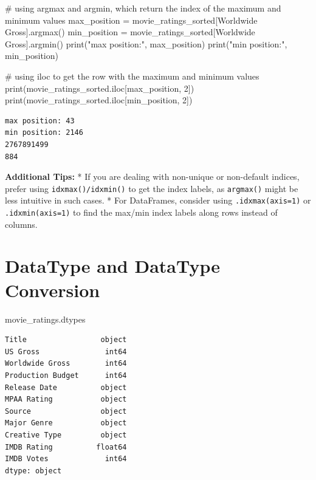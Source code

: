 \documentclass[
  letterpaper,
  DIV=11,
  numbers=noendperiod]{scrreprt}
\newenvironment{Shaded}{\begin{snugshade}}{\end{snugshade}}
\newcommand{\BuiltInTok}[1]{\textcolor[rgb]{0.00,0.23,0.31}{#1}}
\newcommand{\CommentTok}[1]{\textcolor[rgb]{0.37,0.37,0.37}{#1}}
\newcommand{\DecValTok}[1]{\textcolor[rgb]{0.68,0.00,0.00}{#1}}
\newcommand{\NormalTok}[1]{\textcolor[rgb]{0.00,0.23,0.31}{#1}}
\newcommand{\OperatorTok}[1]{\textcolor[rgb]{0.37,0.37,0.37}{#1}}
\newcommand{\StringTok}[1]{\textcolor[rgb]{0.13,0.47,0.30}{#1}}
\begin{document}
\begin{Shaded}
\begin{Highlighting}[]
\CommentTok{\# using argmax and argmin, which return the index of the maximum and minimum values}
\NormalTok{max\_position }\OperatorTok{=}\NormalTok{ movie\_ratings\_sorted[}\StringTok{\textquotesingle{}Worldwide Gross\textquotesingle{}}\NormalTok{].argmax()}
\NormalTok{min\_position }\OperatorTok{=}\NormalTok{ movie\_ratings\_sorted[}\StringTok{\textquotesingle{}Worldwide Gross\textquotesingle{}}\NormalTok{].argmin()}
\BuiltInTok{print}\NormalTok{(}\StringTok{"max position:"}\NormalTok{, max\_position)}
\BuiltInTok{print}\NormalTok{(}\StringTok{"min position:"}\NormalTok{, min\_position)}

\CommentTok{\# using iloc to get the row with the maximum and minimum values}
\BuiltInTok{print}\NormalTok{(movie\_ratings\_sorted.iloc[max\_position, }\DecValTok{2}\NormalTok{])}
\BuiltInTok{print}\NormalTok{(movie\_ratings\_sorted.iloc[min\_position, }\DecValTok{2}\NormalTok{])}
\end{Highlighting}
\end{Shaded}

\begin{verbatim}
max position: 43
min position: 2146
2767891499
884
\end{verbatim}

\textbf{Additional Tips:} * If you are dealing with non-unique or
non-default indices, prefer using \texttt{idxmax()/idxmin()} to get the
index labels, as \texttt{argmax()} might be less intuitive in such
cases. * For DataFrames, consider using \texttt{.idxmax(axis=1)} or
\texttt{.idxmin(axis=1)} to find the max/min index labels along rows
instead of columns.

\hypertarget{datatype-and-datatype-conversion}{%
\section{DataType and DataType
Conversion}\label{datatype-and-datatype-conversion}}

\begin{Shaded}
\begin{Highlighting}[]
\NormalTok{movie\_ratings.dtypes}
\end{Highlighting}
\end{Shaded}

\begin{verbatim}
Title                 object
US Gross               int64
Worldwide Gross        int64
Production Budget      int64
Release Date          object
MPAA Rating           object
Source                object
Major Genre           object
Creative Type         object
IMDB Rating          float64
IMDB Votes             int64
dtype: object
\end{verbatim}
\end{document}
